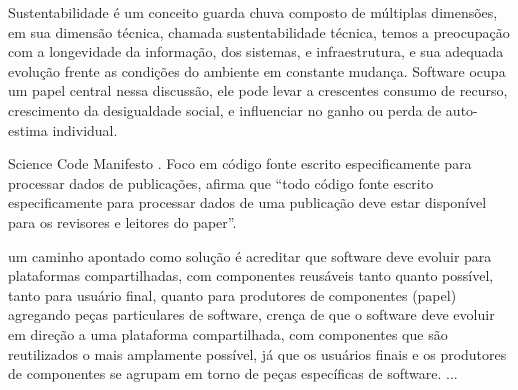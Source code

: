 Sustentabilidade é um conceito guarda chuva composto de múltiplas dimensões, em
sua dimensão técnica, chamada sustentabilidade técnica, temos a preocupação com
a longevidade da informação, dos sistemas, e infraestrutura, e sua adequada
evolução frente as condições do ambiente em constante mudança. Software ocupa
um papel central nessa discussão, ele pode levar a crescentes consumo de
recurso, crescimento da desigualdade social, e influenciar no ganho ou perda de
auto-estima individual.

Science Code Manifesto \cite{barnes2013science}.
Foco em código fonte escrito especificamente para processar dados de
publicações, afirma que ``todo código fonte escrito especificamente para
processar dados de uma publicação deve estar disponível para os revisores e
leitores do paper''.

um caminho apontado como solução é acreditar que software deve evoluir para plataformas compartilhadas,
com componentes reusáveis tanto quanto possível, tanto para usuário final, quanto
para produtores de componentes (papel) agregando peças particulares de software,
crença de que o software deve evoluir em direção a uma plataforma
compartilhada, com componentes que são reutilizados o mais amplamente possível,
já que os usuários finais e os produtores de componentes se agrupam em torno de
peças específicas de software.
...
